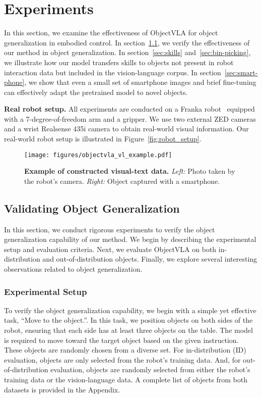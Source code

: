 \section{Experiments}
In this section, we examine the effectiveness of ObjectVLA for object generalization in embodied control. In section~\ref{sec:validate}, we verify the effectiveness of our method in object generalization. In section~\ref{sec:skills} and~\ref{sec:bin-picking}, we illustrate how our model transfers skills to objects not present in robot interaction data but included in the vision-language corpus. In section~\ref{sec:smart-phone}, we show that even a small set of smartphone images and brief fine-tuning can effectively adapt the pretrained model to novel objects.

\noindent
\textbf{Real robot setup.} All experiments are conducted on a Franka robot~\cite{haddadin2024franka} equipped with a 7-degree-of-freedom arm and a gripper. We use two external ZED cameras and a wrist Realsense 435i camera to obtain real-world visual information. Our real-world robot setup is illustrated in Figure~\ref{fig:robot_setup}.

\begin{figure*}[t]
    \centering
    \texttt{[image: figures/objectvla\_vl\_example.pdf]}
    \caption{\textbf{Example of constructed visual-text data.} \textit{Left:} Photo taken by the robot's camera. \textit{Right:} Object captured with a smartphone.}\label{fig:examples}
\end{figure*}






\subsection{Validating Object Generalization}
\label{sec:validate}
In this section, we conduct rigorous experiments to verify the object generalization capability of our method. We begin by describing the experimental setup and evaluation criteria. Next, we evaluate ObjectVLA on both in-distribution and out-of-distribution objects. Finally, we explore several interesting observations related to object generalization.
\subsubsection{Experimental Setup}
To verify the object generalization capability, we begin with a simple yet effective task, ``Move to the object.''. In this task, we position objects on both sides of the robot, ensuring that each side has at least three objects on the table. The model is required to move toward the target object based on the given instruction. These objects are randomly chosen from a diverse set. For in-distribution (ID) evaluation, objects are only selected from the robot's training data. And, for out-of-distribution evaluation, objects are randomly selected from either the robot's training data or the vision-language data. A complete list of objects from both datasets is provided in the Appendix.

